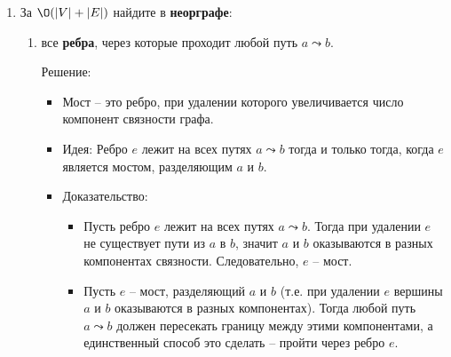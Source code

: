 \begin{enumerate}
\begin{itemize}
      \item На каждом шаге сохраняем старого родителя, меняем родителя на предыдущую вершину пути, переходим дальше.

      Примерный код:
      \begin{verbatim}
      prev = -1
      curr = q
      while curr != -1:
          next = parent[curr]
          parent[curr] = prev
          prev = curr
          curr = next
      \end{verbatim}

      \item Сложность по времени: $\O(|V|)$ -- длина пути от $q \leadsto r$ не превышает $|E|$. Однако нам дано дерево, поэтому $|E| = |V| - 1$

      \item Сложность по памяти: $\O(1)$ -- нужно только 3 фиксированных переменных.
    \end{itemize}


  \item
    За $\O(|V| + |E|)$ найдите в \textbf{неорграфе}:
    \begin{enumerate}
      \item все \textbf{ребра}, через которые проходит любой путь $a \leadsto b$.
      
      Решение:

      \begin{itemize}
        \item Мост -- это ребро, при удалении которого увеличивается число компонент связности графа.

        \item Идея: Ребро $e$ лежит на всех путях $a \leadsto b$ тогда и только тогда, когда $e$ является мостом, разделяющим $a$ и $b$.

        \item Доказательство:
        \begin{itemize}
          \item[$\Rightarrow$] Пусть ребро $e$ лежит на всех путях $a \leadsto b$. Тогда при удалении $e$ не существует пути из $a$ в $b$, значит $a$ и $b$ оказываются в разных компонентах связности. Следовательно, $e$ -- мост.
          
          \item[$\Leftarrow$] Пусть $e$ -- мост, разделяющий $a$ и $b$ (т.е. при удалении $e$ вершины $a$ и $b$ оказываются в разных компонентах). Тогда любой путь $a \leadsto b$ должен пересекать границу между этими компонентами, а единственный способ это сделать -- пройти через ребро $e$.
        \end{itemize}


\end{itemize}
\end{enumerate}
\end{enumerate}
